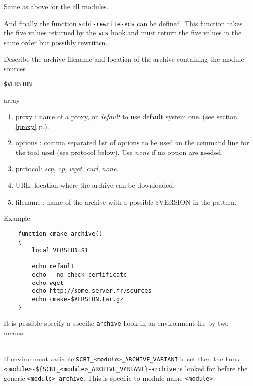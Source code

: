 \documentclass[a4paper,12pt,twoside]{article}
\newcommand{\code}[1]{\texttt{#1}}
\renewcommand{\emph}[1]{\textit{#1}}
\newcommand{\seeref}[1]{see section \ref{#1} p.\pageref{#1}}
\begin{document}
\begin{description}[font=\large\texttt]
\begin{description}[style=standard]
		\item[\code{SCBI\_VCS\_VARIANT}] Same as above for the all modules.
	\end{description}

	And finally the function \code{scbi-rewrite-vcs} can be defined. This function takes the five values returned by the \code{vcs} hook and must return the five values in the same order but possibly rewritten.

	\item[<module>{[}-<variant>{]}-archive] \label{hookarchive}Describe the archive filename and location of the archive containing the module sources.
	\begin{description}[font=\textit,style=standard]
		\item[parameter] \tabto{2cm} \code{\$VERSION}
		\item[return] \tabto{2cm} array
		\begin{enumerate}
		\item proxy : name of a proxy, or \emph{default} to use default system one. (\seeref{proxy}).
		\item options : comma separated list of options to be used on the command line for the tool used (see protocol below). Use \emph{none} if no option are needed.
		\item protocol: \emph{scp}, \emph{cp}, \emph{wget}, \emph{curl}, \emph{none}.
		\item URL: location where the archive can be downloaded.
		\item filename : name of the archive with a possible \$VERSION in the pattern.
		\end{enumerate}
	\end{description}

	Example:
	\begin{lstlisting}
	function cmake-archive()
	{
		local VERSION=$1

		echo default
		echo --no-check-certificate
		echo wget
		echo http://some.server.fr/sources
		echo cmake-$VERSION.tar.gz
	}
	\end{lstlisting}

	It is possible specify a specific \code{archive} hook in an environment file by two means:

	\begin{description}[style=standard]
		\item[\code{SCBI\_<module>\_ARCHIVE\_VARIANT}] \hfill \\
		If environment variable \code{SCBI\_<module>\_ARCHIVE\_VARIANT} is set then the hook \\ \code{<module>-\$\{SCBI\_<module>\_ARCHIVE\_VARIANT\}-archive} is looked for before the generic \code{<module>-archive}. This is specific to module name \code{<module>}.


\end{description}
\end{description}
\end{document}
